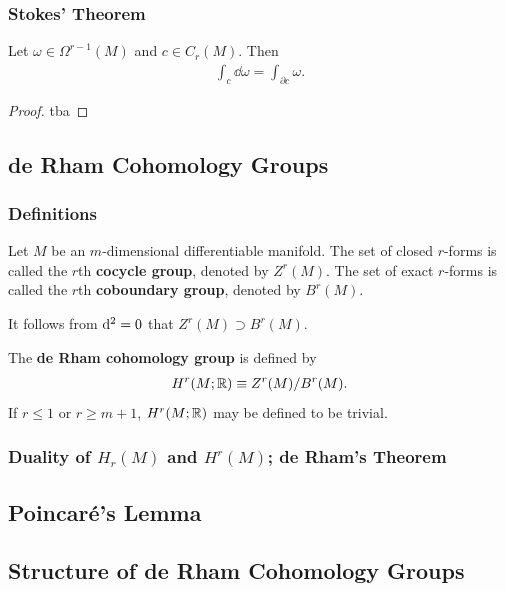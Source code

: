 \documentclass[10pt]{article}
\begin{document}
\subsubsection{Stokes' Theorem}
\begin{theorem}
    Let $\omega\in\Omega^{r-1}(M)$ and $c\in C_r(M)$.
    Then
    \begin{align}
        \int_c \dd{\omega}=\int_{\partial c}\omega.
    \end{align}
\end{theorem}
\begin{proof}
    tba
\end{proof}
\subsection{de Rham Cohomology Groups}
\subsubsection{Definitions}
\begin{definition}
    Let $M$ be an $m$-dimensional differentiable manifold.
    The set of closed $r$-forms is called the $r$th \textbf{cocycle group}, denoted by $Z^r(M)$.
    The set of exact $r$-forms is called the $r$th \textbf{coboundary group}, denoted by $B^r(M)$.
\end{definition}
\begin{property}
    It follows from $\mathrm{d}^2=0$ that $Z^r(M)\supset B^r(M)$.
\end{property}
\begin{definition}
    The \textbf{de Rham cohomology group} is defined by
    \begin{align}
        H^r(M;\mathbb{R})\equiv Z^r(M)/B^r(M).
    \end{align}
    If $r\leq1$ or $r\geq m+1$, $H^r(M;\mathbb{R})$ may be defined to be trivial.
\end{definition}

\subsubsection{Duality of \texorpdfstring{{}$H_r(M)$}{} and \texorpdfstring{{}$H^r(M)$}{}; de Rham's Theorem}
\subsection{Poincar{\'e}'s Lemma}
\subsection{Structure of de Rham Cohomology Groups}
\end{document}
